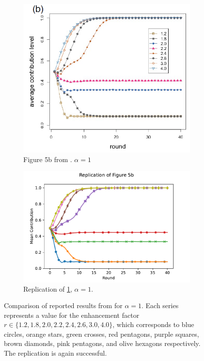 \FloatBarrier
\begin{figure}[!h] 
  \begin{subfigure}[b]{0.45\textwidth}
    \includegraphics[width=\textwidth]{images/TAfig4b_real.png}
    \caption{Figure 5b from \cite{RN49}. $\alpha = 1$ }
    \label{TAfig4b_real}
  \end{subfigure}
  \hfill
  \begin{subfigure}[b]{0.45\textwidth}
    \includegraphics[width=1.35\textwidth]{images/final_TAfig5b.pdf}
    \caption{Replication of \ref{TAfig4b_real}, $\alpha=1$. }
    \label{TAfig4b}
  \end{subfigure}
  \caption{Comparison of reported results from \cite{RN49} for $\alpha = 1$. Each series represents a value for the enhancement factor $r \in \{1.2, 1.8, 2.0, 2.2, 2.4, 2.6, 3.0, 4.0\}$, which corresponds to blue circles, orange stars, green crosses, red pentagons, purple squares, brown diamonds, pink pentagons, and olive hexagons respectively. The replication is again successful. } \label{comp2}
\end{figure} 
\FloatBarrier

